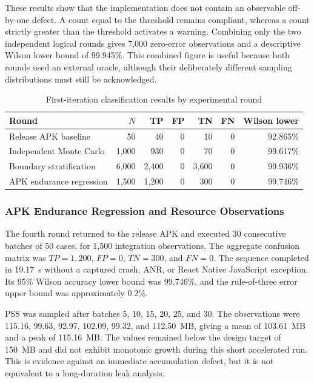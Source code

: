 These results show that the implementation does not contain an observable off-by-one defect. A count equal to the threshold remains compliant, whereas a count strictly greater than the threshold activates a warning. Combining only the two independent logical rounds gives 7,000 zero-error observations and a descriptive Wilson lower bound of 99.945\%. This combined figure is useful because both rounds used an external oracle, although their deliberately different sampling distributions must still be acknowledged.

\begin{table}[H]
\centering
\caption{First-iteration classification results by experimental round}
\label{tab:ch5-first-iteration}
\small
\begin{tabular}{lrrrrrr}
\toprule
\textbf{Round} & \textbf{\(N\)} & \textbf{TP} & \textbf{FP} & \textbf{TN} & \textbf{FN} & \textbf{Wilson lower} \\
\midrule
Release APK baseline & 50 & 40 & 0 & 10 & 0 & 92.865\% \\
Independent Monte Carlo & 1,000 & 930 & 0 & 70 & 0 & 99.617\% \\
Boundary stratification & 6,000 & 2,400 & 0 & 3,600 & 0 & 99.936\% \\
APK endurance regression & 1,500 & 1,200 & 0 & 300 & 0 & 99.746\% \\
\bottomrule
\end{tabular}
\end{table}

\subsubsection{APK Endurance Regression and Resource Observations}

The fourth round returned to the release APK and executed 30 consecutive batches of 50 cases, for 1,500 integration observations. The aggregate confusion matrix was \(TP=1,200\), \(FP=0\), \(TN=300\), and \(FN=0\). The sequence completed in 19.17~s without a captured crash, ANR, or React Native JavaScript exception. Its 95\% Wilson accuracy lower bound was 99.746\%, and the rule-of-three error upper bound was approximately 0.2\%.

PSS was sampled after batches 5, 10, 15, 20, 25, and 30. The observations were 115.16, 99.63, 92.97, 102.09, 99.32, and 112.50~MB, giving a mean of 103.61~MB and a peak of 115.16~MB. The values remained below the design target of 150~MB and did not exhibit monotonic growth during this short accelerated run. This is evidence against an immediate accumulation defect, but it is not equivalent to a long-duration leak analysis.

